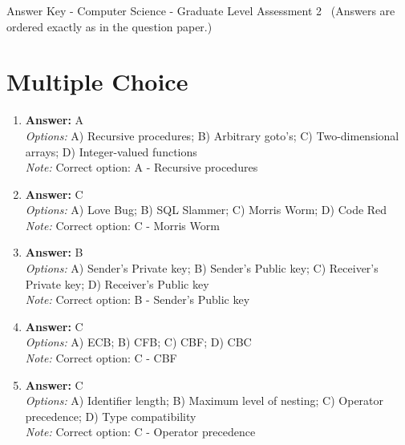 \documentclass[12pt]{article}
\begin{document}
\begin{center}
Answer Key - Computer Science - Graduate Level Assessment 2 \
\small (Answers are ordered exactly as in the question paper.)
\end{center}

\section*{Multiple Choice}
\begin{enumerate}[label=\arabic*.]
\item \textbf{Answer:} A
\\ \textit{Options:} A) Recursive procedures; B) Arbitrary goto's; C) Two-dimensional arrays; D) Integer-valued functions
\\ \textit{Note:} Correct option: A - Recursive procedures
\item \textbf{Answer:} C
\\ \textit{Options:} A) Love Bug; B) SQL Slammer; C) Morris Worm; D) Code Red
\\ \textit{Note:} Correct option: C - Morris Worm
\item \textbf{Answer:} B
\\ \textit{Options:} A) Sender's Private key; B) Sender's Public key; C) Receiver's Private key; D) Receiver's Public key
\\ \textit{Note:} Correct option: B - Sender's Public key
\item \textbf{Answer:} C
\\ \textit{Options:} A) ECB; B) CFB; C) CBF; D) CBC
\\ \textit{Note:} Correct option: C - CBF
\item \textbf{Answer:} C
\\ \textit{Options:} A) Identifier length; B) Maximum level of nesting; C) Operator precedence; D) Type compatibility
\\ \textit{Note:} Correct option: C - Operator precedence
\end{enumerate}
\end{document}

